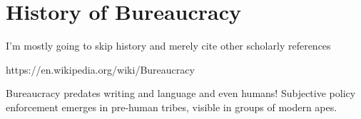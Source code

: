 \section{History of Bureaucracy}

I'm mostly going to skip history and merely cite other scholarly references


https://en.wikipedia.org/wiki/Bureaucracy

Bureaucracy predates writing and language and even humans! Subjective policy enforcement emerges in pre-human tribes, visible in groups of modern apes. 
